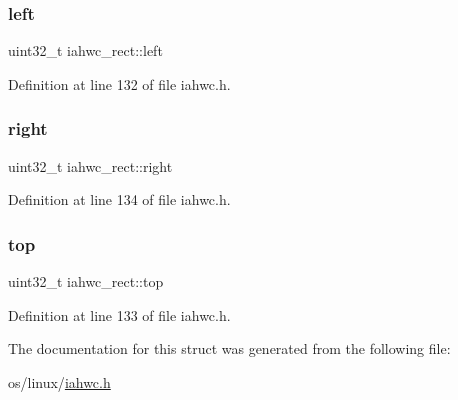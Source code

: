 \subsubsection{\texorpdfstring{left}{left}}
{\footnotesize\ttfamily uint32\+\_\+t iahwc\+\_\+rect\+::left}



Definition at line 132 of file iahwc.\+h.

\mbox{\label{structiahwc__rect_a94734af35b59300dd43a54e42bb68ea4}} 
\subsubsection{\texorpdfstring{right}{right}}
{\footnotesize\ttfamily uint32\+\_\+t iahwc\+\_\+rect\+::right}



Definition at line 134 of file iahwc.\+h.

\mbox{\label{structiahwc__rect_a16e4547c603c2367753b32a76e547d91}} 
\subsubsection{\texorpdfstring{top}{top}}
{\footnotesize\ttfamily uint32\+\_\+t iahwc\+\_\+rect\+::top}



Definition at line 133 of file iahwc.\+h.



The documentation for this struct was generated from the following file\+:\begin{DoxyCompactItemize}
\item 
os/linux/\mbox{\hyperlink{iahwc_8h}{iahwc.\+h}}\end{DoxyCompactItemize}
